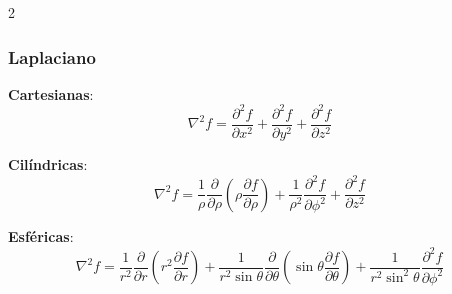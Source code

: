 \begin{multicols}{2}
\subsubsection*{Laplaciano}
\begin{itemform}
    \item \textbf{Cartesianas}:
    $$\nabla^2 f = \frac{\partial^2 f}{\partial x^2} + \frac{\partial^2 f}{\partial y^2} + \frac{\partial^2 f}{\partial z^2}$$
    
    \item \textbf{Cilíndricas}:
    $$\nabla^2 f = \frac{1}{\rho}\frac{\partial}{\partial \rho}\left(\rho\frac{\partial f}{\partial \rho}\right) + \frac{1}{\rho^2}\frac{\partial^2 f}{\partial \phi^2} + \frac{\partial^2 f}{\partial z^2}$$
    
    \item \textbf{Esféricas}:
    $$\nabla^2 f = \frac{1}{r^2}\frac{\partial}{\partial r}\left(r^2\frac{\partial f}{\partial r}\right) + \frac{1}{r^2\sin\theta}\frac{\partial}{\partial \theta}\left(\sin\theta\frac{\partial f}{\partial \theta}\right) + \frac{1}{r^2\sin^2\theta}\frac{\partial^2 f}{\partial \phi^2}$$
\end{itemform}

\end{multicols}
\newpage
